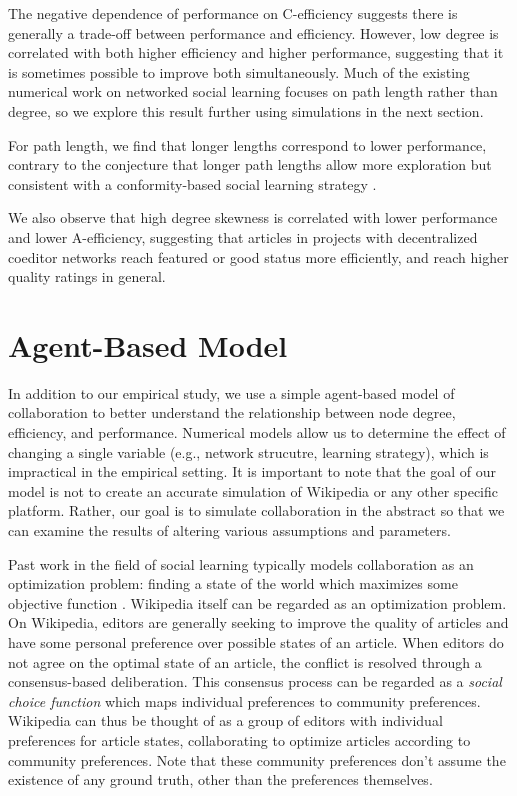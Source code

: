 The negative dependence of performance on C-efficiency suggests there is generally a trade-off between
performance and efficiency.
However, low degree is correlated with both higher efficiency and higher performance,
suggesting that it is sometimes possible to improve both simultaneously.
Much of the existing numerical work on networked social learning focuses on path length rather than degree,
so we explore this result further using simulations in the next section.

For path length, we find that longer lengths correspond to lower performance, contrary to the conjecture
that longer path lengths allow more exploration \cite{mason_propagation_2008}
but consistent with a conformity-based social learning strategy \cite{barkoczi_social_2016}.

We also observe that high degree skewness is correlated with lower performance and lower A-efficiency,
suggesting that articles in projects with decentralized coeditor networks reach featured or good status
more efficiently, and reach higher quality ratings in general.

\section{Agent-Based Model}
\label{sec:sim}

In addition to our empirical study,
we use a simple agent-based model of collaboration to better understand
the relationship between node degree, efficiency, and performance.
Numerical models allow us to determine the effect of changing a single
variable (e.g., network strucutre, learning strategy),
which is impractical in the empirical setting.
It is important to note that the goal of our model is not to create an
accurate simulation of Wikipedia or any other specific platform.
Rather, our goal is to simulate collaboration in the abstract so that we can
examine the results of altering various assumptions and parameters.

Past work in the field of social learning typically models collaboration
as an optimization problem:
finding a state of the world which maximizes some objective function
\cite{lazer_network_2007,mason_propagation_2008,mason_collaborative_2012,barkoczi_social_2016}.
Wikipedia itself can be regarded as an optimization problem.
On Wikipedia, editors are generally seeking to improve the quality of articles
and have some personal preference over possible states of an article.
When editors do not agree on the optimal state of an article,
the conflict is resolved through a consensus-based deliberation.
This consensus process can be regarded as a {\em social choice function}
\cite{arrow_social_2012,brandt_computational_2012}
which maps individual preferences to community preferences.
Wikipedia can thus be thought of as a group of editors with individual preferences
for article states,
collaborating to optimize articles according to community preferences.
Note that these community preferences don't assume the existence of any
ground truth, other than the preferences themselves.

